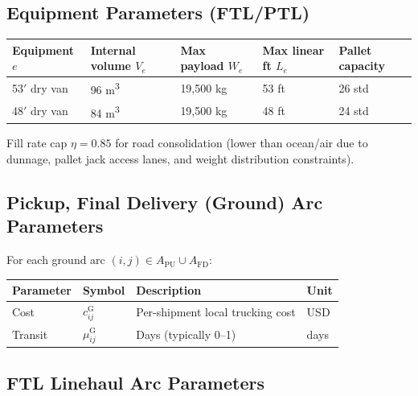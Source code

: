 \documentclass[11pt,a4paper]{article}
\theoremstyle{definition}
\begin{document}
\subsection{Equipment Parameters (FTL/PTL)}

\begin{center}
\begin{tabular}{lllll}
\toprule
Equipment $e$ & Internal volume $V_e$ & Max payload $W_e$ & Max linear ft $L_e$ & Pallet capacity \\
\midrule
53$'$ dry van & 96 m\textsuperscript{3} & 19,500 kg & 53 ft & 26 std \\
48$'$ dry van & 84 m\textsuperscript{3} & 19,500 kg & 48 ft & 24 std \\
\bottomrule
\end{tabular}
\end{center}

Fill rate cap $\eta = 0.85$ for road consolidation (lower than ocean/air due to dunnage,
pallet jack access lanes, and weight distribution constraints).

\subsection{Pickup, Final Delivery (Ground) Arc Parameters}

For each ground arc $(i,j) \in A_{\text{PU}} \cup A_{\text{FD}}$:
\begin{center}
\begin{tabular}{llp{6cm}l}
\toprule
Parameter & Symbol & Description & Unit \\
\midrule
Cost & $c_{ij}^{\text{G}}$ & Per-shipment local trucking cost & USD \\
Transit & $\mu_{ij}^{\text{G}}$ & Days (typically 0--1) & days \\
\bottomrule
\end{tabular}
\end{center}

\subsection{FTL Linehaul Arc Parameters}
\label{sec:ftl-params}
\end{document}
